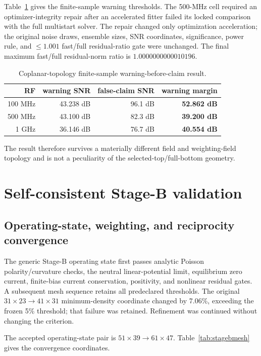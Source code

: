 \documentclass[11pt]{article}
\begin{document}
Table~\ref{tab:coplanar} gives the finite-sample warning thresholds. The 500-MHz cell required an optimizer-integrity repair after an accelerated fitter failed its locked comparison with the full multistart solver. The repair changed only optimization acceleration; the original noise draws, ensemble sizes, SNR coordinates, significance, power rule, and $\le1.001$ fast/full residual-ratio gate were unchanged. The final maximum fast/full residual-norm ratio is $1.0000000000010196$.

\begin{table}[H]
\centering
\caption{Coplanar-topology finite-sample warning-before-claim result.}
\label{tab:coplanar}
\begin{tabular}{rrrr}
\toprule
RF & warning SNR & false-claim SNR & warning margin\\
\midrule
100 MHz & 43.238 dB & 96.1 dB & \textbf{52.862 dB}\\
500 MHz & 43.100 dB & 82.3 dB & \textbf{39.200 dB}\\
1 GHz & 36.146 dB & 76.7 dB & \textbf{40.554 dB}\\
\bottomrule
\end{tabular}
\end{table}

The result therefore survives a materially different field and weighting-field topology and is not a peculiarity of the selected-top/full-bottom geometry.

\section{Self-consistent Stage-B validation}

\subsection{Operating-state, weighting, and reciprocity convergence}

The generic Stage-B operating state first passes analytic Poisson polarity/curvature checks, the neutral linear-potential limit, equilibrium zero current, finite-bias current conservation, positivity, and nonlinear residual gates. A subsequent mesh sequence retains all predeclared thresholds. The original $31\times23\rightarrow41\times31$ minimum-density coordinate changed by 7.06\%, exceeding the frozen 5\% threshold; that failure was retained. Refinement was continued without changing the criterion.

The accepted operating-state pair is $51\times39\rightarrow61\times47$. Table~\ref{tab:stagebmesh} gives the convergence coordinates.
\end{document}
